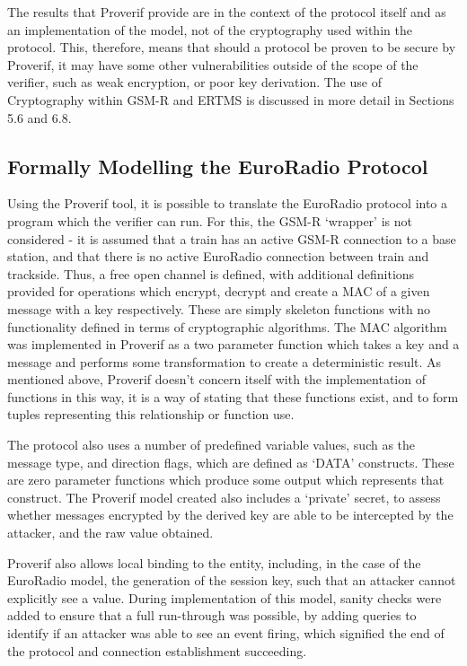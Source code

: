 \documentclass[twoside,11pt,a4paper]{article}
\begin{document}
The results that Proverif provide are in the context of the protocol itself and as an implementation of the model, not of the cryptography used within the protocol. This, therefore, means that should a protocol be proven to be secure by Proverif, it may have some other vulnerabilities outside of the scope of the verifier, such as weak encryption, or poor key derivation. The use of Cryptography within GSM-R and ERTMS is discussed in more detail in Sections 5.6 and 6.8.
\subsection{Formally Modelling the EuroRadio Protocol}
Using the Proverif tool, it is possible to translate the EuroRadio protocol into a program which the verifier can run. For this, the GSM-R `wrapper' is not considered - it is assumed that a train has an active GSM-R connection to a base station, and that there is no active EuroRadio connection between train and trackside. Thus, a free open channel is defined, with additional definitions provided for operations which encrypt, decrypt and create a MAC of a given message with a key respectively. These are simply skeleton functions with no functionality defined in terms of cryptographic algorithms. The MAC algorithm was implemented in Proverif as a two parameter function which takes a key and a message and performs some transformation to create a deterministic result. As mentioned above, Proverif doesn't concern itself with the implementation of functions in this way, it is a way of stating that these functions exist, and to form tuples representing this relationship or function use.

The protocol also uses a number of predefined variable values, such as the message type, and direction flags, which are defined as `DATA' constructs. These are zero parameter functions which produce some output which represents that construct. The Proverif model created also includes a `private' secret, to assess whether messages encrypted by the derived key are able to be intercepted by the attacker, and the raw value obtained.

Proverif also allows local binding to the entity, including, in the case of the EuroRadio model, the generation of the session key, such that an attacker cannot explicitly see a value. During implementation of this model, sanity checks were added to ensure that a full run-through was possible, by adding queries to identify if an attacker was able to see an event firing, which signified the end of the protocol and connection establishment succeeding.
\end{document}
